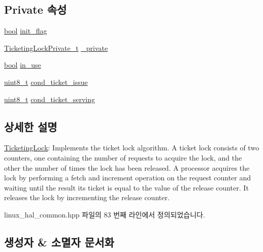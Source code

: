 \subsection*{Private 속성}
\begin{DoxyCompactItemize}
\item 
\hyperlink{avb__gptp_8h_af6a258d8f3ee5206d682d799316314b1}{bool} \hyperlink{class_ticketing_lock_a9298e04a9d0130ff1545e0914d419de5}{init\+\_\+flag}
\item 
\hyperlink{linux__hal__common_8hpp_aef905914edfb58f54aac91ad5d4b2ad8}{Ticketing\+Lock\+Private\+\_\+t} \hyperlink{class_ticketing_lock_a351c5faad8218bb8571b5d784b7f364f}{\+\_\+private}
\item 
\hyperlink{avb__gptp_8h_af6a258d8f3ee5206d682d799316314b1}{bool} \hyperlink{class_ticketing_lock_a7768b84c51671204cc736430f48246a0}{in\+\_\+use}
\item 
\hyperlink{stdint_8h_aba7bc1797add20fe3efdf37ced1182c5}{uint8\+\_\+t} \hyperlink{class_ticketing_lock_a8b7a3b091ea1d5901833b1b38d7d5338}{cond\+\_\+ticket\+\_\+issue}
\item 
\hyperlink{stdint_8h_aba7bc1797add20fe3efdf37ced1182c5}{uint8\+\_\+t} \hyperlink{class_ticketing_lock_a4ee669f5608abcc6ffdfc0f5df01e6cf}{cond\+\_\+ticket\+\_\+serving}
\end{DoxyCompactItemize}


\subsection{상세한 설명}
\hyperlink{class_ticketing_lock}{Ticketing\+Lock}\+: Implements the ticket lock algorithm. A ticket lock consists of two counters, one containing the number of requests to acquire the lock, and the other the number of times the lock has been released. A processor acquires the lock by performing a fetch and increment operation on the request counter and waiting until the result its ticket is equal to the value of the release counter. It releases the lock by incrementing the release counter. 

linux\+\_\+hal\+\_\+common.\+hpp 파일의 83 번째 라인에서 정의되었습니다.



\subsection{생성자 \& 소멸자 문서화}
